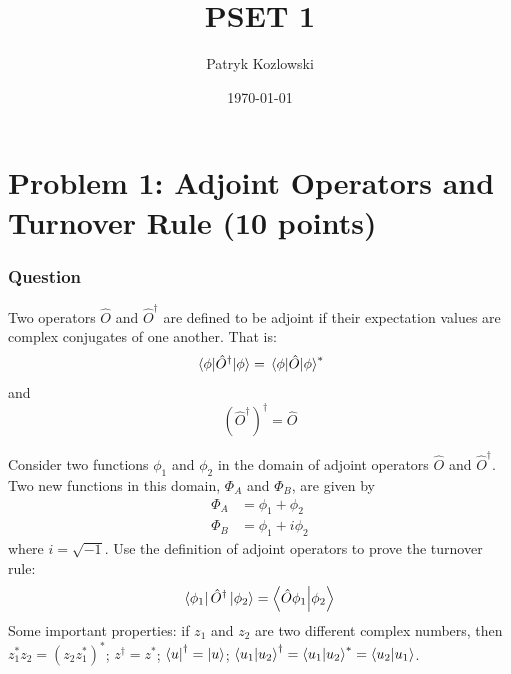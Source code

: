 \documentclass{article}
\title{PSET 1}
\author{Patryk Kozlowski}
\date{\today}
\begin{document}
\maketitle
\section{Problem 1: Adjoint Operators and Turnover Rule (10 points)}
\subsubsection{Question}
Two operators $\hat{O}$ and $\hat{O}^\dagger$ are defined to be adjoint if their expectation values are complex conjugates of one another. That is:
\begin{equation*}
    \expval{\hat{O}^\dagger}{\phi} = \expval{\hat{O}}{\phi}^*
\end{equation*}
and
\begin{equation*}
    (\hat{O}^\dagger)^\dagger = \hat{O}
\end{equation*}

Consider two functions $\phi_1$ and $\phi_2$ in the domain of adjoint operators $\hat{O}$ and $\hat{O}^\dagger$. Two new functions in this domain, $\Phi_A$ and $\Phi_B$, are given by
\begin{align*}
    \Phi_A &= \phi_1 + \phi_2 \\
    \Phi_B &= \phi_1 + i\phi_2
\end{align*}
where $i = \sqrt{-1}$. Use the definition of adjoint operators to prove the turnover rule:
\begin{equation*}
    \bra{\phi _{1}}\hat{O}^\dagger\ket{\phi _{2}}= \bra{\hat{O} \phi _{1}}\ket{\phi _{2}}
\end{equation*}
Some important properties: if $z_1$ and $z_2$ are two different complex numbers, then $z_1^*z_2=(z_2z_1^*)^*$; $z^\dagger = z^*$; $\bra{u}^\dagger = \ket{u}$; $\bra{u_1}\ket{u_2}^\dagger= \bra{u_1}\ket{u_2}^*= \bra{u_2}\ket{u_1}$.
\end{document}
